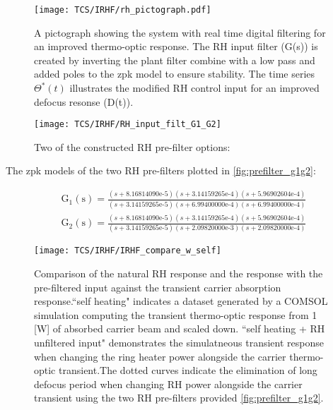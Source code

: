 \begin{figure}[H]
    \centering
    \texttt{[image: TCS/IRHF/rh\_pictograph.pdf]}
    \caption{A pictograph showing the system with real time digital filtering for an improved thermo-optic response. The RH input filter (G(s)) is created by inverting the plant filter combine with a low pass and added poles to the zpk model to ensure stability. The time series $\Theta^*(t)$ illustrates the modified RH control input for an improved defocus resonse (D(t)).}
    \label{fig:rtdf_pictograph}
\end{figure}

\begin{figure}[H]
    \centering
    \texttt{[image: TCS/IRHF/RH\_input\_filt\_G1\_G2]}
    \caption{Two of the constructed RH pre-filter options: 
	}
    \label{fig:prefilter_g1g2}
\end{figure}

The zpk models of the two RH pre-filters plotted in \autoref{fig:prefilter_g1g2}:

\begin{equation}
   \begin{aligned}
       \mathrm{G}_1(\mathrm{s}) = \frac{(s+8.16814090\mathrm{e}\text{-}5) (s+3.14159265\mathrm{e}\text{-}4) (s+5.96902604\mathrm{e}\text{-}4)}{(s+3.14159265\mathrm{e}\text{-}5)(s+6.99400000\mathrm{e}\text{-}4)(s+6.99400000\mathrm{e}\text{-}4)} \\
       \mathrm{G}_2(\mathrm{s}) = \frac{(s+8.16814090\mathrm{e}\text{-}5) (s+3.14159265\mathrm{e}\text{-}4) (s+5.96902604\mathrm{e}\text{-}4)}{(s+3.14159265\mathrm{e}\text{-}5)(s+2.09820000\mathrm{e}\text{-}3)(s+2.09820000\mathrm{e}\text{-}4)}
    \end{aligned}
\end{equation}

\begin{figure}[H]
    \centering
    \texttt{[image: TCS/IRHF/IRHF\_compare\_w\_self]}
    \caption{Comparison of the natural RH response and the response with the pre-filtered input against the transient carrier absorption response.``self heating" indicates a dataset generated by a COMSOL simulation computing the transient thermo-optic response from 1 [W] of absorbed carrier beam and scaled down. ``self heating + RH unfiltered input" demonstrates the simulatneous transient response when changing the ring heater power alongside the carrier thermo-optic transient.The dotted curves indicate the elimination of long defocus period when changing RH power alongside the carrier transient using the two RH pre-filters provided \autoref{fig:prefilter_g1g2}. }
    \label{fig:dynam_comparison}
\end{figure}

